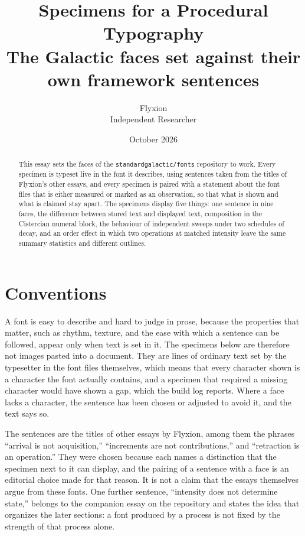 \documentclass[11pt]{article}
\title{Specimens for a Procedural Typography\\[0.4em]
\large The Galactic faces set against their own framework sentences}
\author{Flyxion\\ \small Independent Researcher}
\date{October 2026}
\begin{document}
\maketitle


\begin{abstract}\noindent
This essay sets the faces of the \texttt{standardgalactic/fonts} repository to work. Every specimen is typeset live in the font it describes, using sentences taken from the titles of Flyxion's other essays, and every specimen is paired with a statement about the font files that is either measured or marked as an observation, so that what is shown and what is claimed stay apart. The specimens display five things: one sentence in nine faces, the difference between stored text and displayed text, composition in the Cistercian numeral block, the behaviour of independent sweeps under two schedules of decay, and an order effect in which two operations at matched intensity leave the same summary statistics and different outlines.
\end{abstract}


\section{Conventions}

A font is easy to describe and hard to judge in prose, because the properties that matter, such as rhythm, texture, and the ease with which a sentence can be followed, appear only when text is set in it. The specimens below are therefore not images pasted into a document. They are lines of ordinary text set by the typesetter in the font files themselves, which means that every character shown is a character the font actually contains, and a specimen that required a missing character would have shown a gap, which the build log reports. Where a face lacks a character, the sentence has been chosen or adjusted to avoid it, and the text says so.

The sentences are the titles of other essays by Flyxion, among them the phrases ``arrival is not acquisition,'' ``increments are not contributions,'' and ``retraction is an operation.'' They were chosen because each names a distinction that the specimen next to it can display, and the pairing of a sentence with a face is an editorial choice made for that reason. It is not a claim that the essays themselves argue from these fonts. One further sentence, ``intensity does not determine state,'' belongs to the companion essay on the repository and states the idea that organizes the later sections: a font produced by a process is not fixed by the strength of that process alone.
\end{document}
